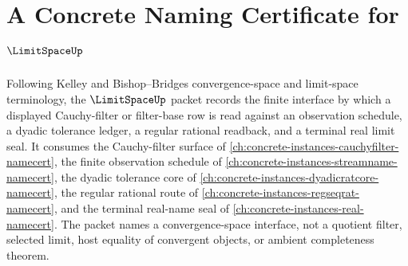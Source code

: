 \chapter{A Concrete Naming Certificate for $\LimitSpaceUp$}
\label{ch:concrete-instances-limit-space-namecert}

Following Kelley and Bishop--Bridges convergence-space and limit-space terminology, the $\LimitSpaceUp$ packet records the finite interface by which a displayed Cauchy-filter or filter-base row is read against an observation schedule, a dyadic tolerance ledger, a regular rational readback, and a terminal real limit seal. It consumes the Cauchy-filter surface of \autoref{ch:concrete-instances-cauchyfilter-namecert}, the finite observation schedule of \autoref{ch:concrete-instances-streamname-namecert}, the dyadic tolerance core of \autoref{ch:concrete-instances-dyadicratcore-namecert}, the regular rational route of \autoref{ch:concrete-instances-regseqrat-namecert}, and the terminal real-name seal of \autoref{ch:concrete-instances-real-namecert}. The packet names a convergence-space interface, not a quotient filter, selected limit, host equality of convergent objects, or ambient completeness theorem.

